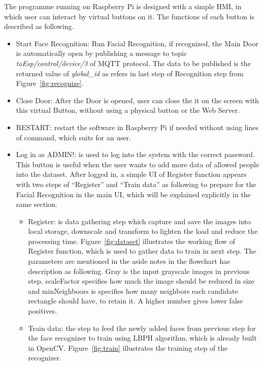     The programme running on Raspberry Pi is designed with a simple HMI, in which user can interact by virtual buttons on it. The functions of each button is described as following.
    \begin{itemize}
        \item Start Face Recognition: Run Facial Recognition, if recognized, the Main Door is automatically open by publishing a message to topic \textit{toEsp/control/device/3} of MQTT protocol. The data to be published is the returned value of \textit{global\_id} as refers in last step of Recognition step from Figure~\ref{fig:recognize}.
        \item Close Door: After the Door is opened, user can close the it on the screen with this virtual Button, without using a physical button or the Web Server.
        \item RESTART: restart the software in Raspberry Pi if needed without using lines of command, which suits for an user.
        \item Log in as ADMIN!: is used to log into the system with the correct password. This button is useful when the user wants to add more data of allowed people into the dataset. After logged in, a simple UI of Register function appears with two steps of “Register” and “Train data” as following  to prepare for the Facial Recognition in the main UI, which will be explained explicitly in the same section.
            \begin{itemize}
            \item Register: is data gathering step which capture and save the images into local storage, downscale and transform to lighten the load and reduce the processing time. Figure~\ref{fig:dataset} illustrates the working flow of Register function, which is used to gather data to train in next step. The parameters are mentioned in the aside notes in the flowchart has description as following. Gray is the input grayscale images in previous step, scaleFactor specifies how much the image should be reduced in size and minNeighboors is specifies how many neighbors each candidate rectangle should have, to retain it. A higher number gives lower false positives.
            \item Train data: the step to feed the newly added faces from previous step for the face recognizer to train using LBPH algorithm, which is already built in OpenCV. Figure~\ref{fig:train} illustrates the training step of the recognizer.
            \end{itemize}
        \end{itemize}
